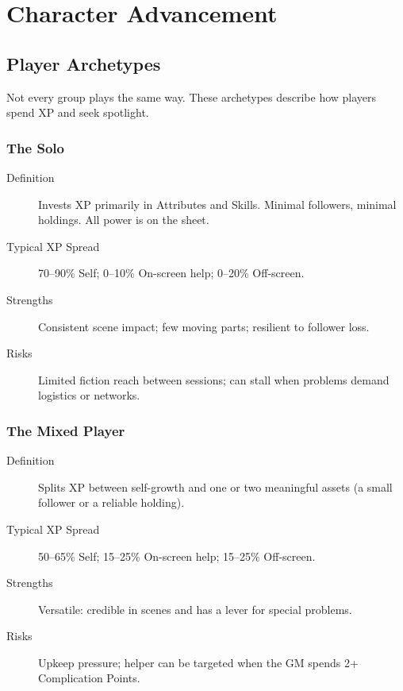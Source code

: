 \chapter{Character Advancement}

\section{Player Archetypes}

Not every group plays the same way. These archetypes describe how players spend XP and seek spotlight.

\subsection{The Solo}

\begin{description}
\item[Definition] Invests XP primarily in Attributes and Skills. Minimal followers, minimal holdings. All power is on the sheet.
\item[Typical XP Spread] 70--90\% Self; 0--10\% On-screen help; 0--20\% Off-screen.
\item[Strengths] Consistent scene impact; few moving parts; resilient to follower loss.
\item[Risks] Limited fiction reach between sessions; can stall when problems demand logistics or networks.
\end{description}

\subsection{The Mixed Player}

\begin{description}
\item[Definition] Splits XP between self-growth and one or two meaningful assets (a small follower or a reliable holding).
\item[Typical XP Spread] 50--65\% Self; 15--25\% On-screen help; 15--25\% Off-screen.
\item[Strengths] Versatile: credible in scenes and has a lever for special problems.
\item[Risks] Upkeep pressure; helper can be targeted when the GM spends 2+ Complication Points.
\end{description}

